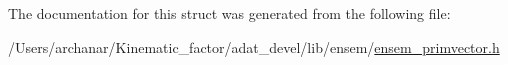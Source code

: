 The documentation for this struct was generated from the following file\+:\begin{DoxyCompactItemize}
\item 
/\+Users/archanar/\+Kinematic\+\_\+factor/adat\+\_\+devel/lib/ensem/\mbox{\hyperlink{lib_2ensem_2ensem__primvector_8h}{ensem\+\_\+primvector.\+h}}\end{DoxyCompactItemize}
